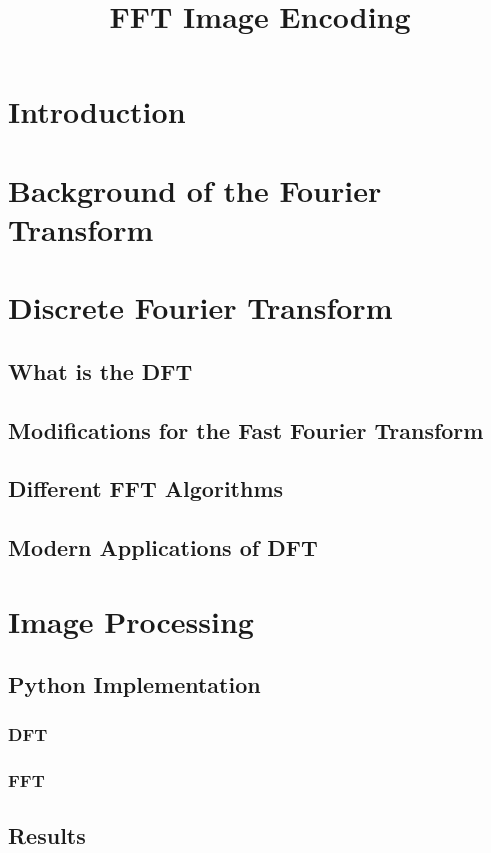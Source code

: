 \documentclass[sigplan]{acmart}
\title{FFT Image Encoding}
\begin{document}
  \maketitle



  \section{Introduction}
  
  \section{Background of the Fourier Transform}
  
  \section{Discrete Fourier Transform}
  	\subsection{What is the DFT}
  	\subsection{Modifications for the Fast Fourier Transform}
  	\subsection{Different FFT Algorithms}
  	\subsection{Modern Applications of DFT}
  
  \section{Image Processing}
 	 \subsection{Python Implementation}
 	 	\subsubsection{DFT}
 		\subsubsection{FFT}
     \subsection{Results}
\end{document}
